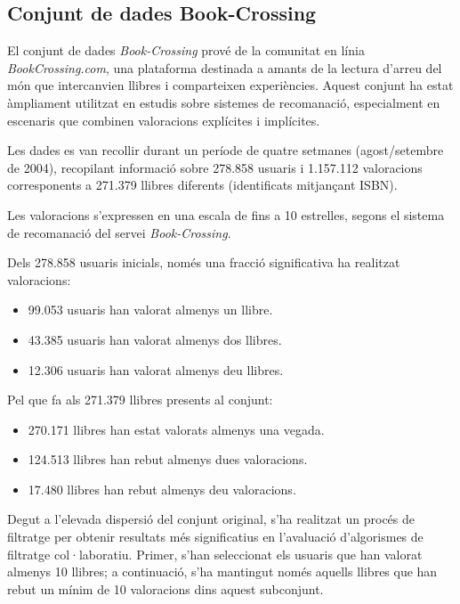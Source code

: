 \documentclass[a4paper,12pt]{report}
\begin{document}
\subsection{Conjunt de dades Book-Crossing}

El conjunt de dades \emph{Book-Crossing} \cite{ziegler2005improving} prové de la comunitat en línia \emph{BookCrossing.com}, una plataforma destinada a amants de la lectura d’arreu del món que intercanvien llibres i comparteixen experiències. Aquest conjunt ha estat àmpliament utilitzat en estudis sobre sistemes de recomanació, especialment en escenaris que combinen valoracions explícites i implícites.

Les dades es van recollir durant un període de quatre setmanes (agost/setembre de 2004), recopilant informació sobre 278.858 usuaris i 1.157.112 valoracions corresponents a 271.379 llibres diferents (identificats mitjançant ISBN).

Les valoracions s’expressen en una escala de fins a 10 estrelles, segons el sistema de recomanació del servei \emph{Book-Crossing}.

Dels 278.858 usuaris inicials, només una fracció significativa ha realitzat valoracions:

\begin{itemize}
    \item 99.053 usuaris han valorat almenys un llibre.
    \item 43.385 usuaris han valorat almenys dos llibres.
    \item 12.306 usuaris han valorat almenys deu llibres.
\end{itemize}

Pel que fa als 271.379 llibres presents al conjunt:

\begin{itemize}
    \item 270.171 llibres han estat valorats almenys una vegada.
    \item 124.513 llibres han rebut almenys dues valoracions.
    \item 17.480 llibres han rebut almenys deu valoracions.
\end{itemize}

Degut a l’elevada dispersió del conjunt original, s’ha realitzat un procés de filtratge per obtenir resultats més significatius en l’avaluació d’algorismes de filtratge col·laboratiu. Primer, s’han seleccionat els usuaris que han valorat almenys 10 llibres; a continuació, s’ha mantingut només aquells llibres que han rebut un mínim de 10 valoracions dins aquest subconjunt.
\end{document}
